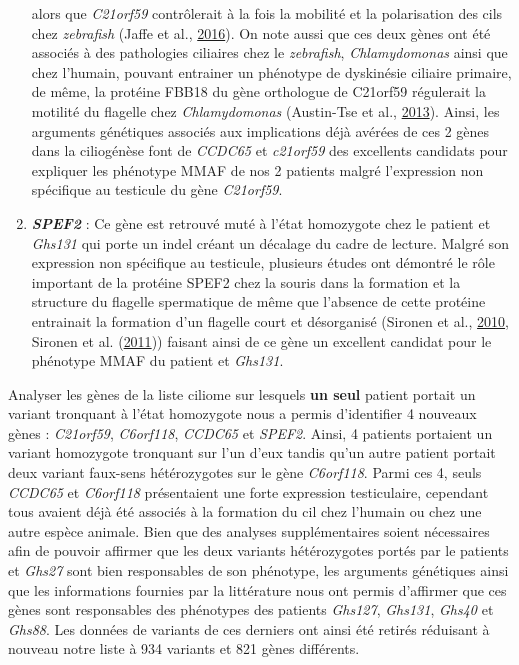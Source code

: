 \documentclass[12pt,twoside]{reedthesis}
\theoremstyle{definition}
\theoremstyle{definition}
\theoremstyle{remark}
\begin{document}
\begin{enumerate}
    alors que \emph{C21orf59} contrôlerait à la fois la mobilité et la
    polarisation des cils chez \emph{zebrafish} (Jaffe et al.,
    \protect\hyperlink{ref-Jaffe2016}{2016}). On note aussi que ces deux
    gènes ont été associés à des pathologies ciliaires chez le
    \emph{zebrafish}, \emph{Chlamydomonas} ainsi que chez l'humain,
    pouvant entrainer un phénotype de dyskinésie ciliaire primaire, de
    même, la protéine FBB18 du gène orthologue de C21orf59 régulerait la
    motilité du flagelle chez \emph{Chlamydomonas} (Austin-Tse et al.,
    \protect\hyperlink{ref-Austin-Tse2013}{2013}). Ainsi, les arguments
    génétiques associés aux implications déjà avérées de ces 2 gènes dans
    la ciliogénèse font de \emph{CCDC65} et \emph{c21orf59} des excellents
    candidats pour expliquer les phénotype MMAF de nos 2 patients malgré
    l'expression non spécifique au testicule du gène \emph{C21orf59}.
  \item
    \textbf{\emph{SPEF2}} : Ce gène est retrouvé muté à l'état homozygote
    chez le patient et \emph{Ghs131} qui porte un indel créant un décalage
    du cadre de lecture. Malgré son expression non spécifique au
    testicule, plusieurs études ont démontré le rôle important de la
    protéine SPEF2 chez la souris dans la formation et la structure du
    flagelle spermatique de même que l'absence de cette protéine
    entrainait la formation d'un flagelle court et désorganisé (Sironen et
    al., \protect\hyperlink{ref-Sironen2010}{2010}, Sironen et al.
    (\protect\hyperlink{ref-Sironen2011}{2011})) faisant ainsi de ce gène
    un excellent candidat pour le phénotype MMAF du patient et
    \emph{Ghs131}.
  \end{enumerate}
  
  Analyser les gènes de la liste ciliome sur lesquels \textbf{un seul}
  patient portait un variant tronquant à l'état homozygote nous a permis
  d'identifier 4 nouveaux gènes : \emph{C21orf59}, \emph{C6orf118},
  \emph{CCDC65} et \emph{SPEF2}. Ainsi, 4 patients portaient un variant
  homozygote tronquant sur l'un d'eux tandis qu'un autre patient portait
  deux variant faux-sens hétérozygotes sur le gène \emph{C6orf118}. Parmi
  ces 4, seuls \emph{CCDC65} et \emph{C6orf118} présentaient une forte
  expression testiculaire, cependant tous avaient déjà été associés à la
  formation du cil chez l'humain ou chez une autre espèce animale. Bien
  que des analyses supplémentaires soient nécessaires afin de pouvoir
  affirmer que les deux variants hétérozygotes portés par le patients et
  \emph{Ghs27} sont bien responsables de son phénotype, les arguments
  génétiques ainsi que les informations fournies par la littérature nous
  ont permis d'affirmer que ces gènes sont responsables des phénotypes des
  patients \emph{Ghs127}, \emph{Ghs131}, \emph{Ghs40} et \emph{Ghs88}. Les
  données de variants de ces derniers ont ainsi été retirés réduisant à
  nouveau notre liste à 934 variants et 821 gènes différents.
  
\end{document}
